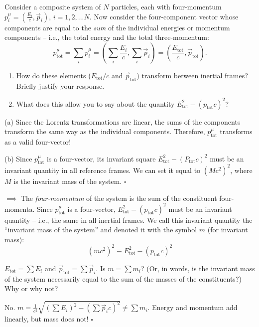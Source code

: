 \documentclass[11pt, letterpaper, openany]{book}
\newenvironment{exercise}[1][Exercise]{%
  \tcolorbox[blanker, breakable, left=1em,
    before skip=1em, after skip=1em,
    borderline west={3pt}{0pt}{PhysNavy},
    colback=PhysCream,
    before upper={\textcolor{PhysNavy}{\sffamily\bfseries #1:}\space}
  ]%
}{%
  \endtcolorbox%
}
\newenvironment{solution}[1][Solution]{%
  \tcolorbox[blanker, breakable, left=1em,
    before skip=1em, after skip=1em,
    borderline west={2pt}{0pt}{PhysTeal},
    colback=PhysCream,
    before upper={\textcolor{PhysTeal}{\sffamily\bfseries #1.}\space}
  ]%
}{%
  \hfill\textcolor{PhysTeal}{\ensuremath{\square}}\endtcolorbox%
}
\begin{document}
\begin{exercise}[Exercise 1]
Consider a composite system of $N$ particles, each with four-momentum $p^\mu_i = (\frac{E_i}{c}, \vec{p}_i)$, $i = 1, 2, ... N$. Now consider the four-component vector whose components are equal to the \textit{sum} of the individual energies or momentum components -- i.e., the total energy and the total three-momentum:
\[ p^\mu_{\text{tot}} = \sum_i p^\mu_i = \left(\sum_i \frac{E_i}{c}, \sum_i \vec{p}_i\right) = \left(\frac{E_{\text{tot}}}{c}, \vec{p}_{\text{tot}}\right). \]
\begin{enumerate}[label=(\alph*)]
    \item How do these elements ($E_{\text{tot}}/c$ and $\vec{p}_{\text{tot}}$) transform between inertial frames? Briefly justify your response.
    \item What does this allow you to say about the quantity $E_{\text{tot}}^2 - (p_{\text{tot}}c)^2$?
\end{enumerate}
\end{exercise}
\begin{solution}
(a) Since the Lorentz transformations are linear, the sums of the components transform the same way as the individual components. Therefore, $p^\mu_{\text{tot}}$ transforms as a valid four-vector!

(b) Since $p^\mu_{\text{tot}}$ is a four-vector, its invariant square $E_{\text{tot}}^2 - (P_{\text{tot}}c)^2$ must be an invariant quantity in all reference frames. We can set it equal to $(Mc^2)^2$, where $M$ is the invariant mass of the system.
\end{solution}

$\implies$ The \textit{four-momentum} of the system is the sum of the constituent four-momenta. Since $p^\mu_{\text{tot}}$ is a four-vector, $E_{\text{tot}}^2 - (p_{\text{tot}}c)^2$ must be an invariant quantity -- i.e., the same in all inertial frames. We call this invariant quantity the ``invariant mass of the system'' and denoted it with the symbol $m$ (for invariant mass):
\begin{equation}
    (mc^2)^2 \equiv E_{\text{tot}}^2 - (p_{\text{tot}}c)^2
\end{equation}

\begin{exercise}[Question]
$E_{\text{tot}} = \sum E_i$ and $\vec{p}_{\text{tot}} = \sum \vec{p}_i$. Is $m = \sum m_i$? (Or, in words, is the invariant mass of the system necessarily equal to the sum of the masses of the constituents?) Why or why not?
\end{exercise}
\begin{solution}
No. $m = \frac{1}{c^2}\sqrt{(\sum E_i)^2 - (\sum \vec{p}_i c)^2} \neq \sum m_i$. Energy and momentum add linearly, but mass does not!
\end{solution}
\end{document}
